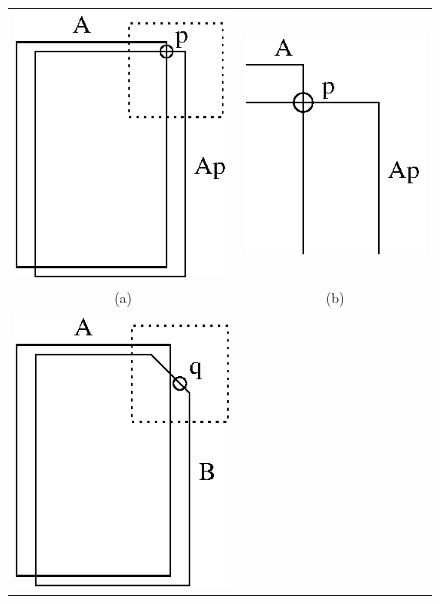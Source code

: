 
\newcommand{\dAe}   {\ensuremath{d_A^\epsilon}}
\newcommand{\dApe}  {\ensuremath{d_A^{+\epsilon}}}
\newcommand{\tdAe}  {\ensuremath{\tilde{d}_A^\epsilon}}
\newcommand{\tdApe} {\ensuremath{\tilde{d}_A^{+\epsilon}}}
\newcommand{\triP}  {\ensuremath{\tau_P}}
\newcommand{\triQ}  {\ensuremath{\tau_Q}}
\newcommand{\triPP} {\ensuremath{\tau'_P}}
\newcommand{\triQQ} {\ensuremath{\tau'_Q}}

\begin{figure}[t]
\centering


\begin{tabular}{cc}
\includegraphics[width=0.4\linewidth]{images/rectA.eps} \qquad &
\qquad
\includegraphics[width=0.4\linewidth]{images/rectAclose.eps} \\
(a) & (b) \\
\includegraphics[width=0.4\linewidth]{images/polyB.eps} \qquad &

\end{tabular}
\end{figure}
